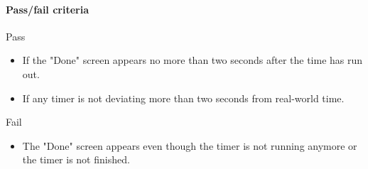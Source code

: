 \paragraph{Pass/fail criteria}
	Pass
	\begin{itemize}
		\item If the "Done" screen appears no more than two seconds after the time has run out.
		\item If any timer is not deviating more than two seconds from real-world time.
	\end{itemize}
	Fail
	\begin{itemize}
		\item The "Done" screen appears even though the timer is not running anymore or the timer is not finished.
	\end{itemize}
	\clearpage